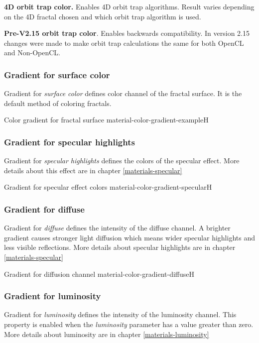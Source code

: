 \textbf{4D orbit trap color.} Enables 4D orbit trap algorithms. Result varies depending on the 4D fractal chosen and which orbit trap algorithm is used.

\textbf{Pre-V2.15 orbit trap color}. Enables backwards compatibility. In version 2.15 changes were made to make orbit trap calculations the same for both OpenCL and  Non-OpenCL.

\subsubsection{Gradient for surface color}\label{materials-surface_color-gradient}

Gradient for \emph{surface color} defines color channel of the fractal surface. It is the default method of coloring fractals.

{Color gradient for fractal surface}
{material-color-gradient-example}{H}

\subsubsection{Gradient for specular highlights}\label{materials-specular-gradient}

Gradient for \emph{specular highlights} defines the colors of the specular effect. More details about this effect are in chapter \ref{materials-specular}

{Gradient for specular effect colors}
{material-color-gradient-specular}{H}

\subsubsection{Gradient for diffuse}\label{materials-diffuse-gradient}

Gradient for \emph{diffuse} defines the intensity of the diffuse channel. A brighter gradient causes stronger light diffusion which means wider specular highlights and less visible reflections. More details about specular highlights are in chapter \ref{materials-specular}

{Gradient for diffusion channel}
{material-color-gradient-diffuse}{H}

\pagebreak
\subsubsection{Gradient for luminosity}\label{materials-luminosity-gradient}
Gradient for \emph{luminosity} defines the intensity of the luminosity channel. This property is enabled when the \emph{luminosity} parameter has a value greater than zero. More details about luminosity are in chapter \ref{materials-luminosity}

